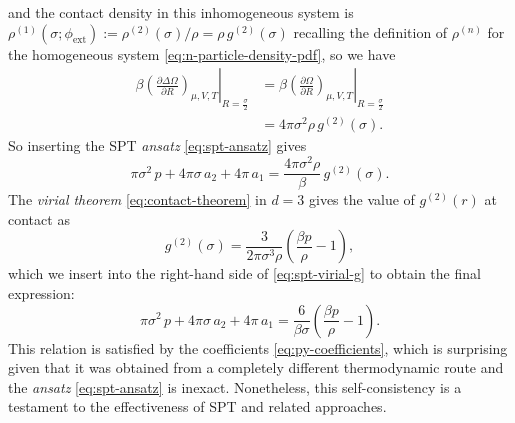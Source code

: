 \documentclass[11pt,twoside]{report}
\begin{document}
and the contact density in this inhomogeneous system is $\rho^{(1)}(\sigma; \phi_\mathrm{ext}) := \rho^{(2)}(\sigma)/\rho = \rho \, g^{(2)}(\sigma)$ recalling the definition of $\rho^{(n)}$ for the homogeneous system%
\eqref{eq:n-particle-density-pdf}, so we have
\begin{equation*}\label{eq:spt-contact-density}
  \begin{split}
    \left. \beta \left( \frac{\partial \Delta \Omega}{\partial R} \right)_{\mu,V,T}
    \right|_{R = \frac{\sigma}{2}}
    &=
    \left. \beta \left( \frac{\partial \Omega}{\partial R} \right)_{\mu,V,T}
    \right|_{R = \frac{\sigma}{2}}
    \\ &=
    4\pi \sigma^2 \rho \, g^{(2)}(\sigma).
  \end{split}
\end{equation*}
So inserting the SPT \emph{ansatz} \eqref{eq:spt-ansatz} gives
\begin{equation}\label{eq:spt-virial-g}
  \pi \sigma^2 \, p
  + 4\pi \sigma \, a_2
  + 4\pi \, a_1
  =
  \frac{4\pi \sigma^2 \rho}{\beta} \, g^{(2)}(\sigma).
\end{equation}
The \emph{virial theorem} \eqref{eq:contact-theorem} in $d=3$ gives the value of $g^{(2)}(r)$ at contact as
\begin{equation}\label{eq:contact-g}
  g^{(2)}(\sigma) =
  \frac{3}{2\pi \sigma^3 \rho} \left( \frac{\beta p}{\rho} - 1 \right),
\end{equation}
which we insert into the right-hand side of \eqref{eq:spt-virial-g} to obtain the final expression:
\begin{equation}\label{eq:spt-virial}
  \pi \sigma^2 \, p
  + 4\pi \sigma \, a_2
  + 4\pi \, a_1
  =
  \frac{6}{\beta\sigma} \left( \frac{\beta p}{\rho} - 1 \right).
\end{equation}
This relation is satisfied by the coefficients \eqref{eq:py-coefficients}, which is surprising given that it was obtained from a completely different thermodynamic route and the \emph{ansatz} \eqref{eq:spt-ansatz} is inexact.
Nonetheless, this self-consistency is a testament to the effectiveness of SPT and related approaches.
\end{document}
